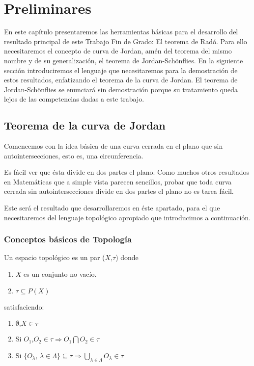 \chapter{Preliminares}

En este capítulo presentaremos las herramientas básicas para el desarrollo del resultado principal de este Trabajo Fin de Grado: El teorema de Radó. Para ello necesitaremos el concepto de curva de Jordan, amén del teorema del mismo nombre y de su generalización, el teorema de Jordan-Schönflies. En la siguiente sección introduciremos el lenguaje que necesitaremos para la demostración de estos resultados, enfatizando el teorema de la curva de Jordan. El teorema de Jordan-Schönflies se enunciará sin demostración porque su tratamiento queda lejos de las competencias dadas a este trabajo.

\section{Teorema de la curva de Jordan}

Comencemos con la idea básica de una curva cerrada en el plano que sin autointersecciones, esto es, una circunferencia.

Es fácil ver   que  ésta divide en dos partes el plano. Como muchos otros resultados en Matemáticas que a simple vista parecen sencillos, probar que toda curva cerrada sin autointersecciones divide en dos partes el plano no es tarea fácil.

Este será el resultado que desarrollaremos en éste apartado, para el que necesitaremos del lenguaje topológico apropiado que introducimos a continuación.

\subsection{Conceptos básicos de Topología}

\begin{definition}
	Un espacio topológico es un par ($X$,$\tau$) donde
	\begin{enumerate}
		\item  $X$ es un conjunto no vacío.
		\item $\tau \subseteq \mathit{P}(X)$
	\end{enumerate}
	satisfaciendo:
	\begin{enumerate}
		\item $\emptyset \text{,} X \in \tau$
		\item Si $O_1 \text{,} O_2 \in \tau \Longrightarrow O_1 \bigcap O_2 \in \tau$
		\item Si $\{ O_\lambda \text{, } \lambda \in \Lambda \} \subseteq \tau \Longrightarrow \bigcup_{\lambda \in \Lambda} O_\lambda \in \tau$
	\end{enumerate}
\end{definition}


